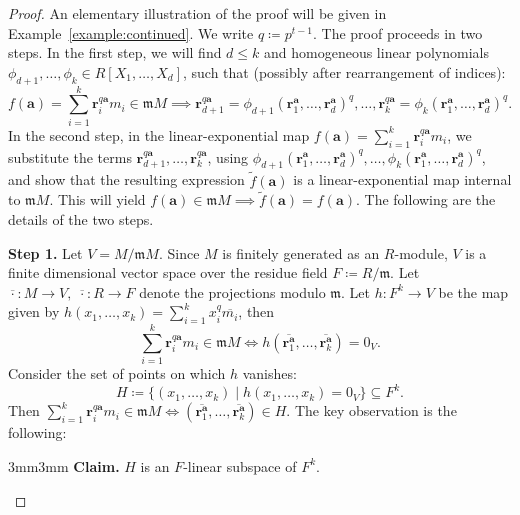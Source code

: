 \documentclass[letterpaper, 11pt, thm-restate]{article}
\numberwithin{equation}{section}
\newcommand{\ba}{\boldsymbol{a}}
\newcommand{\br}{\boldsymbol{r}}
\newcommand{\frm}{\mathfrak{m}}
\theoremstyle{definition}
\theoremstyle{definition}
\theoremstyle{definition}
\begin{document}
\begin{proof}
    An elementary illustration of the proof will be given in Example~\ref{example:continued}.
    We write $q \coloneqq p^{t-1}$.
    The proof proceeds in two steps.
    In the first step, we will find $d \leq k$ and homogeneous linear polynomials $\phi_{d+1}, \ldots, \phi_k \in R[X_1, \ldots, X_d]$, such that (possibly after rearrangement of indices):
    \begin{equation*}
    f(\ba)=\sum_{i=1}^k \br_i^{q\ba}m_i \in \frm M \implies \br_{d+1}^{q\ba} = \phi_{d+1}(\br_1^{\ba}, \ldots, \br_d^{\ba})^q, \ldots, \br_{k}^{q\ba} = \phi_k(\br_1^{\ba}, \ldots, \br_d^{\ba})^q.
    \end{equation*}
    In the second step, in the linear-exponential map $f(\ba)=\sum_{i=1}^k \br_i^{q\ba}m_i$, we substitute the terms $\br_{d+1}^{q\ba}, \ldots, \br_{k}^{q\ba}$, using $\phi_{d+1}(\br_1^{\ba}, \ldots, \br_d^{\ba})^q, \ldots, \phi_k(\br_1^{\ba}, \ldots, \br_d^{\ba})^q$, and show that the resulting expression $\tilde f(\ba)$ is a linear-exponential map internal to $\frm M$.
    This will yield $f(\ba)\in \frm M \implies \tilde f(\ba)=f(\ba)$.
    The following are the details of the two steps.
    \smallskip
    
    \textbf{Step 1.}
    Let $V=M/\frm M$.
    Since $M$ is finitely generated as an $R$-module, $V$ is a finite dimensional vector space over the residue field $F \coloneqq R/\frm$. %
    Let $\overline{\cdot} \colon M\rightarrow V,\; \overline\cdot \colon R\rightarrow F$ denote the projections modulo $\frm$.
    Let $h:F^k\rightarrow V$ be the map given by $h(x_1, \ldots ,x_k)=\sum_{i = 1}^k x_i^q\overline{m_i}$, then
    \[
    \sum_{i=1}^k \br_i^{q\ba}m_i \in \frm M \iff h\left(\overline{\br_1^{\ba}}, \ldots, \overline{\br_k^{\ba}}\right) = 0_V.
    \]
    Consider the set of points on which $h$ vanishes:
    \begin{equation}\label{eq:def_space_H}
    H \coloneqq \{(x_1, \ldots, x_k) \mid h(x_1, \ldots, x_k) = 0_V\} \subseteq F^k.
    \end{equation}
    Then $\sum_{i=1}^k \br_i^{q\ba}m_i \in \frm M \iff \left(\overline{\br_1^{\ba}}, \ldots, \overline{\br_k^{\ba}}\right) \in H$.
    The key observation is the following:

    \medskip
    \begin{adjustwidth}{3mm}{3mm}
    \textbf{Claim.} $H$ is an $F$-linear subspace of $F^k$.
    \medskip
    

\end{adjustwidth}
\end{proof}
\end{document}
